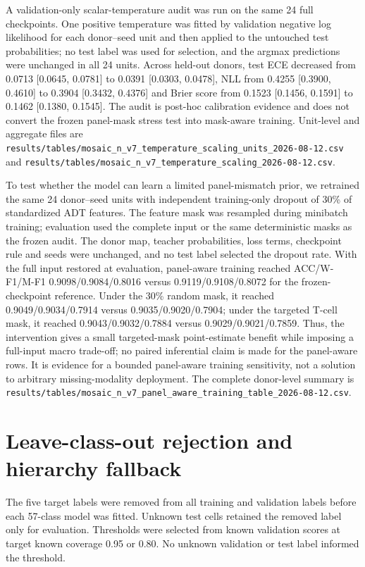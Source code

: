 \documentclass[10pt]{article}
\begin{document}
A validation-only scalar-temperature audit was run on the same 24 full checkpoints. One positive temperature was fitted by validation negative log likelihood for each donor--seed unit and then applied to the untouched test probabilities; no test label was used for selection, and the argmax predictions were unchanged in all 24 units. Across held-out donors, test ECE decreased from 0.0713 [0.0645, 0.0781] to 0.0391 [0.0303, 0.0478], NLL from 0.4255 [0.3900, 0.4610] to 0.3904 [0.3432, 0.4376] and Brier score from 0.1523 [0.1456, 0.1591] to 0.1462 [0.1380, 0.1545]. The audit is post-hoc calibration evidence and does not convert the frozen panel-mask stress test into mask-aware training. Unit-level and aggregate files are
\texttt{results/tables/mosaic\_n\_v7\_temperature\_scaling\_units\_2026-08-12.csv} and
\texttt{results/tables/mosaic\_n\_v7\_temperature\_scaling\_2026-08-12.csv}.

To test whether the model can learn a limited panel-mismatch prior, we retrained the same 24 donor--seed units with independent training-only dropout of 30\% of standardized ADT features. The feature mask was resampled during minibatch training; evaluation used the complete input or the same deterministic masks as the frozen audit. The donor map, teacher probabilities, loss terms, checkpoint rule and seeds were unchanged, and no test label selected the dropout rate. With the full input restored at evaluation, panel-aware training reached ACC/W-F1/M-F1 0.9098/0.9084/0.8016 versus 0.9119/0.9108/0.8072 for the frozen-checkpoint reference. Under the 30\% random mask, it reached 0.9049/0.9034/0.7914 versus 0.9035/0.9020/0.7904; under the targeted T-cell mask, it reached 0.9043/0.9032/0.7884 versus 0.9029/0.9021/0.7859. Thus, the intervention gives a small targeted-mask point-estimate benefit while imposing a full-input macro trade-off; no paired inferential claim is made for the panel-aware rows. It is evidence for a bounded panel-aware training sensitivity, not a solution to arbitrary missing-modality deployment. The complete donor-level summary is
\texttt{results/tables/mosaic\_n\_v7\_panel\_aware\_training\_table\_2026-08-12.csv}.

\section{Leave-class-out rejection and hierarchy fallback}

The five target labels were removed from all training and validation labels before each 57-class model was fitted. Unknown test cells retained the removed label only for evaluation. Thresholds were selected from known validation scores at target known coverage 0.95 or 0.80. No unknown validation or test label informed the threshold.
\end{document}
